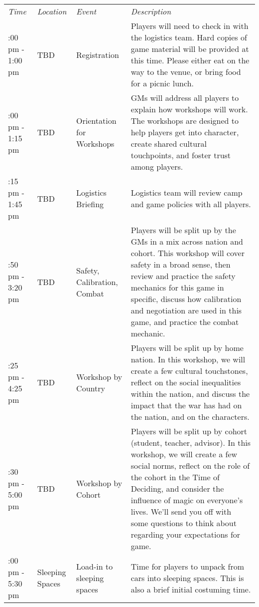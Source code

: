 \documentclass[green]{GL2020}
\begin{document}
\begin{tabularx}{\textwidth}{|>{\centering\arraybackslash} m{1.5cm} | >{\centering\arraybackslash} m{1.5cm} | >{\centering\arraybackslash} m{1.8cm} | >{\centering\arraybackslash}X |}
 \hline
\multicolumn{4}{|c|}{\textbf{Friday (Mandatory Pre-Game Activities) 12:00 pm}} \\
\hline 
 \emph{Time} & \emph{Location} & \emph{Event} & \emph{Description}\\
\hline
 12:00 pm - 1:00 pm   & TBD & Registration &  Players will need to check in with the logistics team. Hard copies of game material will be provided at this time. Please either eat on the way to the venue, or bring food for a picnic lunch. \\
    \hline
  1:00 pm - 1:15 pm  & TBD & Orientation for Workshops & GMs will address all players to explain how workshops will work. The workshops are designed to help players get into character, create shared cultural touchpoints, and foster trust among players. \\
    \hline
  1:15 pm - 1:45 pm & TBD & Logistics Briefing & Logistics team will review camp and game policies with all players. \\
    \hline
  1:50 pm - 3:20 pm & TBD & Safety, Calibration, Combat & Players will be split up by the GMs in a mix across nation and cohort. This workshop will cover safety in a broad sense, then review and practice the safety mechanics for this game in specific, discuss how calibration and negotiation are used in this game, and practice the combat mechanic.\\
 \hline
  3:25 pm - 4:25 pm & TBD & Workshop by Country & Players will be split up by home nation. In this workshop, we will create a few cultural touchstones, reflect on the social inequalities within the nation, and discuss the impact that the war has had on the nation, and on the characters. \\
 \hline
  4:30 pm - 5:00 pm & TBD  &  Workshop by Cohort & Players will be split up by cohort (student, teacher, advisor). In this workshop, we will create a few social norms, reflect on the role of the cohort in the Time of Deciding, and consider the influence of magic on everyone's lives. We'll send you off with some questions to think about regarding your expectations for game.\\
 \hline
 5:00 pm - 5:30 pm & Sleeping Spaces  & Load-in to sleeping spaces & Time for players to unpack from cars into sleeping spaces. This is also a brief initial costuming time. \\

\end{tabularx}
\end{document}
